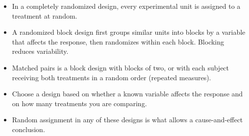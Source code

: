 \begin{mdframed}[style=important, frametitle={Key Ideas}]
\begin{itemize}
\item In a completely randomized design, every experimental unit is assigned to a treatment at random.
\item A randomized block design first groups similar units into blocks by a variable that affects the response, then randomizes within each block. Blocking reduces variability.
\item Matched pairs is a block design with blocks of two, or with each subject receiving both treatments in a random order (repeated measures).
\item Choose a design based on whether a known variable affects the response and on how many treatments you are comparing.
\item Random assignment in any of these designs is what allows a cause-and-effect conclusion.
\end{itemize}
\end{mdframed}
